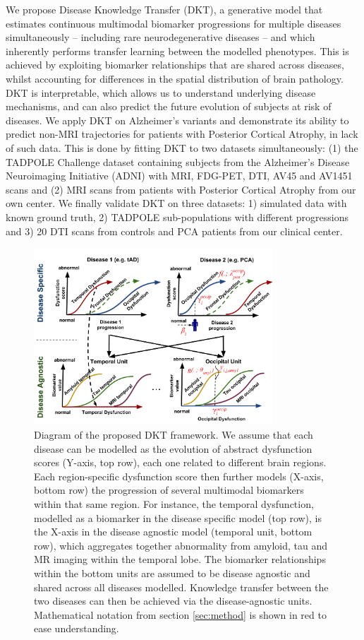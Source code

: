 \documentclass{llncs}
\begin{document}
We propose Disease Knowledge Transfer (DKT), a generative model that estimates continuous multimodal biomarker progressions for multiple diseases simultaneously -- including rare neurodegenerative diseases -- and which inherently performs transfer learning between the modelled phenotypes. This is achieved by exploiting biomarker relationships that are shared across diseases, whilst accounting for differences in the spatial distribution of brain pathology. DKT is interpretable, which allows us to understand underlying disease mechanisms, and can also predict the future evolution of subjects at risk of diseases. We apply DKT on Alzheimer's variants and demonstrate its ability to predict non-MRI trajectories for patients with Posterior Cortical Atrophy, in lack of such data. This is done by fitting DKT to two datasets simultaneously: (1) the TADPOLE Challenge \cite{marinescu2018tadpole} dataset containing subjects from the Alzheimer's Disease Neuroimaging Initiative (ADNI) with MRI, FDG-PET, DTI, AV45 and AV1451 scans and (2) MRI scans from patients with Posterior Cortical Atrophy from our own center. We finally validate DKT on three datasets: 1) simulated data with known ground truth, 2) TADPOLE sub-populations with different progressions and 3) 20 DTI scans from controls and PCA patients from our clinical center.

\begin{figure}[h]
 \centering
 \includegraphics[width=0.8\textwidth,trim=0 0 0 0,clip]{disease_knowledge_transfer_symbols.pdf}
 \caption{Diagram of the proposed DKT framework. We assume that each disease can be modelled as the evolution of abstract dysfunction scores (Y-axis, top row), each one related to different brain regions. Each region-specific dysfunction score then further models (X-axis, bottom row) the progression of several multimodal biomarkers within that same region. For instance, the temporal dysfunction, modelled as a biomarker in the disease specific model (top row), is the X-axis in the disease agnostic model (temporal unit, bottom row), which aggregates together abnormality from amyloid, tau and MR imaging within the temporal lobe. The biomarker relationships within the bottom units are assumed to be disease agnostic and shared across all diseases modelled. Knowledge transfer between the two diseases can then be achieved via the disease-agnostic units. Mathematical notation from section \ref{sec:method} is shown in red to ease understanding.}
 \label{fig:diagram}
\end{figure}
\end{document}
